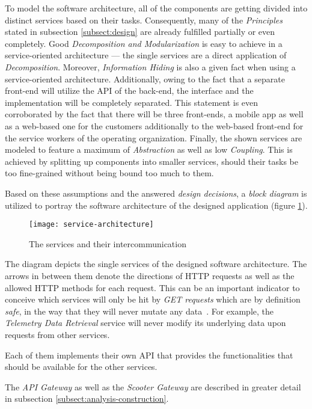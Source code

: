 \documentclass[12pt,a4paper,twoside]{report}
\begin{document}
To model the software architecture, all of the components are getting divided
into distinct services based on their tasks. Consequently, many of the
\textit{Principles} stated in subsection \ref{subsect:design} are already fulfilled
partially or even completely. Good \textit{Decomposition and Modularization} is
easy to achieve in a service-oriented architecture --- the single services
are a direct application of \textit{Decomposition}.
Moreover, \textit{Information Hiding} is also a given fact when using a
service-oriented architecture.
Additionally, owing to the fact that a separate front-end will utilize the API
of the back-end, the interface and the implementation will be completely separated.
This statement is even corroborated by the fact that there will be three front-ends,
a mobile app as well as a web-based one for the customers additionally to the
web-based front-end for the service workers of the operating organization.
Finally, the shown services are modeled to feature a maximum of \textit{Abstraction}
as well as low \textit{Coupling}. This is achieved by splitting up components
into smaller services, should their tasks be too fine-grained without being
bound too much to them.

Based on these assumptions and the answered \textit{design decisions},
a \textit{block diagram} is utilized to portray the software architecture of the
designed application (figure \ref{fig:service-architecture}).\\

\begin{figure}[htbp]
\centering
\texttt{[image: service-architecture]}
\caption{The services and their intercommunication}
\label{fig:service-architecture}
\end{figure}

The diagram depicts the single services of the designed software architecture.
The arrows in between them denote the directions of HTTP requests as well
as the allowed HTTP methods for each request.
This can be an important indicator to conceive which services
will only be hit by \textit{GET requests} which are by definition \textit{safe},
in the way that they will never mutate any data~\cite{http-rfc}.
For example, the \textit{Telemetry Data Retrieval} service will never modify
its underlying data upon requests from other services.

Each of them implements their own API that provides the functionalities that
should be available for the other services.

The \textit{API Gateway} as well as the \textit{Scooter Gateway} are described
in greater detail in subsection \ref{subsect:analysis-construction}.
\end{document}
